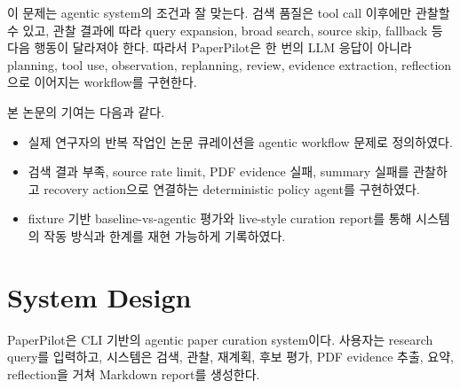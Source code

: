 \documentclass[sigconf,nonacm]{acmart}
\begin{document}
이 문제는 agentic system의 조건과 잘 맞는다. 검색 품질은 tool call 이후에만 관찰할 수 있고, 관찰 결과에 따라 query expansion, broad search, source skip, fallback 등 다음 행동이 달라져야 한다. 따라서 PaperPilot은 한 번의 LLM 응답이 아니라 planning, tool use, observation, replanning, review, evidence extraction, reflection으로 이어지는 workflow를 구현한다.

본 논문의 기여는 다음과 같다.

\begin{itemize}[leftmargin=*]
  \item 실제 연구자의 반복 작업인 논문 큐레이션을 agentic workflow 문제로 정의하였다.
  \item 검색 결과 부족, source rate limit, PDF evidence 실패, summary 실패를 관찰하고 recovery action으로 연결하는 deterministic policy agent를 구현하였다.
  \item fixture 기반 baseline-vs-agentic 평가와 live-style curation report를 통해 시스템의 작동 방식과 한계를 재현 가능하게 기록하였다.
\end{itemize}

\section{System Design}

PaperPilot은 CLI 기반의 agentic paper curation system이다. 사용자는 research query를 입력하고, 시스템은 검색, 관찰, 재계획, 후보 평가, PDF evidence 추출, 요약, reflection을 거쳐 Markdown report를 생성한다.
\end{document}
